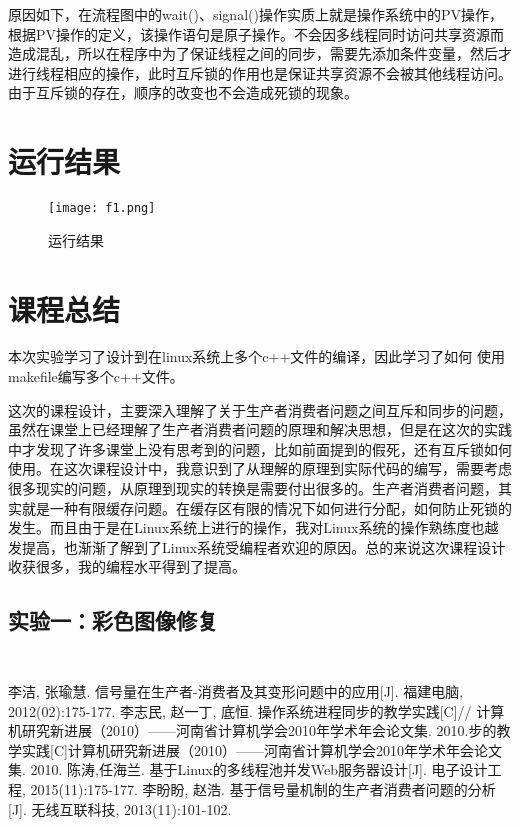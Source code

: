 \documentclass[withoutpreface,bwprint]{cumcmthesis} %
\begin{document}
原因如下，在流程图中的wait()、signal()操作实质上就是操作系统中的PV操作，根据PV操作的定义，该操作语句是原子操作。不会因多线程同时访问共享资源而造成混乱，所以在程序中为了保证线程之间的同步，需要先添加条件变量，然后才进行线程相应的操作，此时互斥锁的作用也是保证共享资源不会被其他线程访问。由于互斥锁的存在，顺序的改变也不会造成死锁的现象。

\section{运行结果}

\begin{figure}[H]
	\centering
	\texttt{[image: f1.png]}
	\caption{ 运行结果 \label{fig:1}}
\end{figure}

\section{课程总结}
本次实验学习了设计到在linux系统上多个c++文件的编译，因此学习了如何
使用makefile编写多个c++文件。

这次的课程设计，主要深入理解了关于生产者消费者问题之间互斥和同步的问题，虽然在课堂上已经理解了生产者消费者问题的原理和解决思想，但是在这次的实践中才发现了许多课堂上没有思考到的问题，比如前面提到的假死，还有互斥锁如何使用。在这次课程设计中，我意识到了从理解的原理到实际代码的编写，需要考虑很多现实的问题，从原理到现实的转换是需要付出很多的。生产者消费者问题，其实就是一种有限缓存问题。在缓存区有限的情况下如何进行分配，如何防止死锁的发生。而且由于是在Linux系统上进行的操作，我对Linux系统的操作熟练度也越发提高，也渐渐了解到了Linux系统受编程者欢迎的原因。总的来说这次课程设计收获很多，我的编程水平得到了提高。

\begin{appendices}
\section{实验一：彩色图像修复}
\begin{lstlisting}[language=python]
   
\end{lstlisting}
\end{appendices}
\begin{thebibliography}{9}%
    李洁, 张瑜慧. 信号量在生产者-消费者及其变形问题中的应用[J]. 福建电脑, 2012(02):175-177.
    李志民, 赵一丁, 底恒. 操作系统进程同步的教学实践[C]// 计算机研究新进展（2010）——河南省计算机学会2010年学术年会论文集. 2010.步的教学实践[C]计算机研究新进展（2010）——河南省计算机学会2010年学术年会论文集. 2010.
    陈涛,任海兰. 基于Linux的多线程池并发Web服务器设计[J]. 电子设计工程, 2015(11):175-177.
    李盼盼, 赵浩. 基于信号量机制的生产者消费者问题的分析[J]. 无线互联科技, 2013(11):101-102.
\end{thebibliography}

\newpage
 
\end{document}
